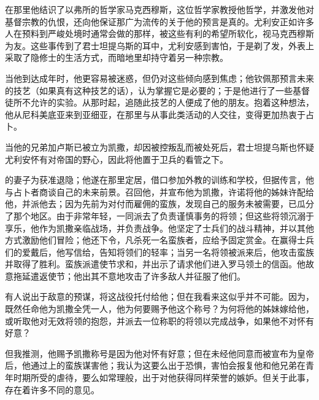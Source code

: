 在那里他结识了以弗所的哲学家马克西穆斯，这位哲学家教授他哲学，并激发他对基督宗教的仇恨，还向他保证那广为流传的关于他的预言是真的。尤利安正如许多人在预料到严峻处境时通常会做的那样，被这些有利的希望所软化，视马克西穆斯为友。这些事传到了君士坦提乌斯的耳中，尤利安感到害怕，于是剃了发，外表上采取了隐修士的生活方式，而暗地里却持守着另一种宗教。\par

当他到达成年时，他更容易被迷惑，但仍对这些倾向感到焦虑；他钦佩那预言未来的技艺（如果真有这种技艺的话），认为掌握它是必要的；于是他进行了一些基督徒所不允许的实验。从那时起，追随此技艺的人便成了他的朋友。抱着这种想法，他从尼科美底亚来到亚细亚，在那里与从事此类活动的人交往，变得更加热衷于占卜。\par

当他的兄弟加卢斯已被立为凯撒，却因被控叛乱而被处死后，君士坦提乌斯也怀疑尤利安怀有对帝国的野心，因此将他置于卫兵的看管之下。\par

的妻子为获准退隐；他遂在那里定居，借口参加外教的训练和学校，但据传言，他与占卜者商谈自己的未来前景。召回他，并宣布他为凯撒，许诺将他的姊妹许配给他，并派他去；因为先前为对付而雇佣的蛮族，发现自己的服务未被需要，已瓜分了那个地区。由于非常年轻，一同派去了负责谨慎事务的将领；但这些将领沉溺于享乐，他作为凯撒亲临战场，并负责战争。他坚定了士兵们的战斗精神，并以其他方式激励他们冒险；他还下令，凡杀死一名蛮族者，应给予固定赏金。在赢得士兵们的爱戴后，他写信给，告知将领们的轻率；当另一名将领被派来后，他攻击蛮族并取得了胜利。蛮族派遣使节求和，并出示了请求他们进入罗马领土的信函。他故意拖延遣返使节；他出其不意地攻击了许多敌人并征服了他们。\par

有人说出于敌意的预谋，将这战役托付给他；但在我看来这似乎并不可能。因为，既然任命他为凯撒全凭一人，他为何要赐予他这个称号？为何将他的姊妹嫁给他，或听取他对无效将领的抱怨，并派去一位称职的将领以完成战争，如果他不对怀有好意？\par

但我推测，他赐予凯撒称号是因为他对怀有好意；但在未经他同意而被宣布为皇帝后，他通过上的蛮族谋害他；我认为这要么出于恐惧，害怕会报复他和他兄弟在青年时期所受的虐待，要么如常理般，出于对他获得同样荣誉的嫉妒。但关于此事，存在着许多不同的意见。\par

